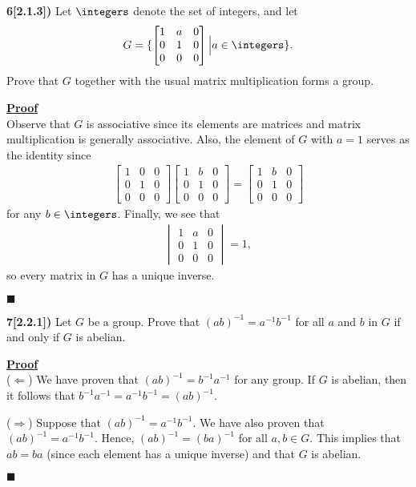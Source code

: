 \documentclass[12pt,a4paper]{article}
\newcommand{\prob}[2]{\textbf{#1)} #2}
\newenvironment{proof}
{
\textbf{\underline{Proof}} \\
}
{
\begin{flushright}
$\blacksquare$
\end{flushright}}
\begin{document}
\prob{6[2.1.3]}{Let $\integers$ denote the set of integers, and let 
\begin{align*}
G = \{\begin{bmatrix}
1 & a & 0 \\
0 & 1 & 0 \\
0 & 0 & 0
\end{bmatrix} \Big| a \in \integers\}.
\end{align*}
Prove that $G$ together with the usual matrix multiplication forms a group.}

\begin{proof}
Observe that $G$ is associative since its elements are matrices and matrix multiplication is generally associative. Also, the element of $G$ with $a = 1$ serves as the identity since
\begin{align*}
\begin{bmatrix}
1 & 0 & 0 \\
0 & 1 & 0 \\
0 & 0 & 0
\end{bmatrix}
\begin{bmatrix}
1 & b & 0 \\
0 & 1 & 0 \\
0 & 0 & 0
\end{bmatrix}
=
\begin{bmatrix}
1 & b & 0 \\
0 & 1 & 0 \\
0 & 0 & 0
\end{bmatrix}
\end{align*}
for any $b \in \integers$. Finally, we see that 
\begin{align*}
\begin{vmatrix}
1 & a & 0 \\
0 & 1 & 0 \\
0 & 0 & 0
\end{vmatrix}
= 1,
\end{align*}
so every matrix in $G$ has a unique inverse.
\end{proof}

\prob{7[2.2.1]}{Let $G$ be a group. Prove that $(ab)^{-1} = a^{-1}b^{-1}$ for all $a$ and $b$ in $G$ if and only if $G$ is abelian.}

\begin{proof}
($\Leftarrow$) We have proven that $(ab)^{-1} = b^{-1}a^{-1}$ for any group. If $G$ is abelian, then it follows that $b^{-1}a^{-1} = a^{-1}b^{-1} = (ab)^{-1}$.

($\Rightarrow$) Suppose that $(ab)^{-1} = a^{-1}b^{-1}$. We have also proven that $(ab)^{-1} = a^{-1}b^{-1}$. Hence, $(ab)^{-1} = (ba)^{-1}$ for all $a,b \in G$. This implies that $ab = ba$ (since each element has a unique inverse) and that $G$ is abelian.
\end{proof}
\end{document}
